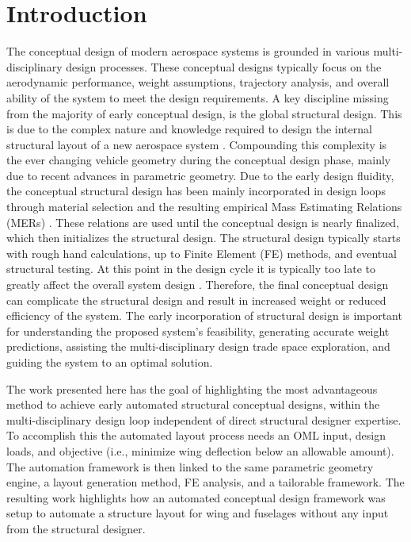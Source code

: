 \documentclass[conf]{new-aiaa}
\begin{document}
\section{Introduction}
The conceptual design of modern aerospace systems is grounded in 
various multi-disciplinary design processes. 
These conceptual designs typically focus on the aerodynamic performance, 
weight assumptions, trajectory analysis, and overall ability of the 
system to meet the design requirements. 
A key discipline missing from the majority of early conceptual design, 
is the global structural design. 
This is due to the complex nature and knowledge required to 
design the internal structural layout of a new aerospace system 
\cite{horvath_aircraft_conceptual_structural_design_using_AMMIT,
      alyanak_efficient_supersonic_air_cehicle_structural_modeling,
      sensmeier_automatic_aircraft_structural_topology_generation_for_multidisc}.
Compounding this complexity is the ever changing vehicle 
geometry during the conceptual design phase, 
mainly due to recent advances in parametric geometry. 
Due to the early design fluidity, 
the conceptual structural design has been mainly incorporated in design 
loops through material selection and the resulting empirical 
Mass Estimating Relations (MERs) 
\cite{horvath_aircraft_conceptual_structural_design_using_AMMIT}.
These relations are used until the conceptual design is nearly finalized, 
which then initializes the structural design. 
The structural design typically starts with rough hand calculations, 
up to Finite Element (FE) methods, and eventual structural testing. 
At this point in the design cycle it is typically too late to greatly 
affect the overall system design 
\cite{alyanak_efficient_supersonic_air_cehicle_structural_modeling}.
Therefore, the final conceptual design can complicate the structural 
design and result in increased weight or reduced efficiency of the system. 
The early incorporation of structural design is important for understanding 
the proposed system's feasibility, generating accurate weight predictions, 
assisting the multi-disciplinary design trade space exploration, 
and guiding the system to an optimal solution.

The work presented here has the goal of highlighting the most 
advantageous method to achieve early automated structural conceptual 
designs, within the multi-disciplinary design loop 
independent of direct structural designer expertise. 
To accomplish this the automated layout process needs an OML input, 
design loads, and objective (i.e., minimize wing deflection below an allowable amount). 
The automation framework is then linked to the same parametric geometry 
engine, a layout generation method, FE analysis, and a tailorable framework. 
The resulting work highlights how an 
automated conceptual design framework was setup to automate a 
structure layout for wing and fuselages without any input from the structural designer. 
\end{document}
